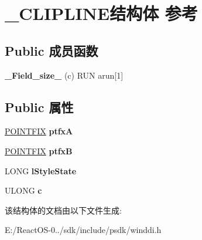 \hypertarget{struct___c_l_i_p_l_i_n_e}{}\section{\+\_\+\+C\+L\+I\+P\+L\+I\+N\+E结构体 参考}
\label{struct___c_l_i_p_l_i_n_e}
\subsection*{Public 成员函数}
\begin{DoxyCompactItemize}
\item 
\mbox{\label{struct___c_l_i_p_l_i_n_e_ada775c7d03df5316164589088659f01d}} 
{\bfseries \+\_\+\+Field\+\_\+size\+\_\+} (c) R\+UN arun\mbox{[}1\mbox{]}
\end{DoxyCompactItemize}
\subsection*{Public 属性}
\begin{DoxyCompactItemize}
\item 
\mbox{\label{struct___c_l_i_p_l_i_n_e_a11b38254505476b17223790c02928c66}} 
\hyperlink{struct___p_o_i_n_t_f_i_x}{P\+O\+I\+N\+T\+F\+IX} {\bfseries ptfxA}
\item 
\mbox{\label{struct___c_l_i_p_l_i_n_e_abc5f2ccd627cb0f49c05fdf585f85206}} 
\hyperlink{struct___p_o_i_n_t_f_i_x}{P\+O\+I\+N\+T\+F\+IX} {\bfseries ptfxB}
\item 
\mbox{\label{struct___c_l_i_p_l_i_n_e_a2e000e61eacf6d5a3f57ce1f5bf9a961}} 
L\+O\+NG {\bfseries l\+Style\+State}
\item 
\mbox{\label{struct___c_l_i_p_l_i_n_e_a6f3a5834ce266ba7fec6117237ddf2c0}} 
U\+L\+O\+NG {\bfseries c}
\end{DoxyCompactItemize}


该结构体的文档由以下文件生成\+:\begin{DoxyCompactItemize}
\item 
E\+:/\+React\+O\+S-\/0../sdk/include/psdk/winddi.\+h\end{DoxyCompactItemize}
